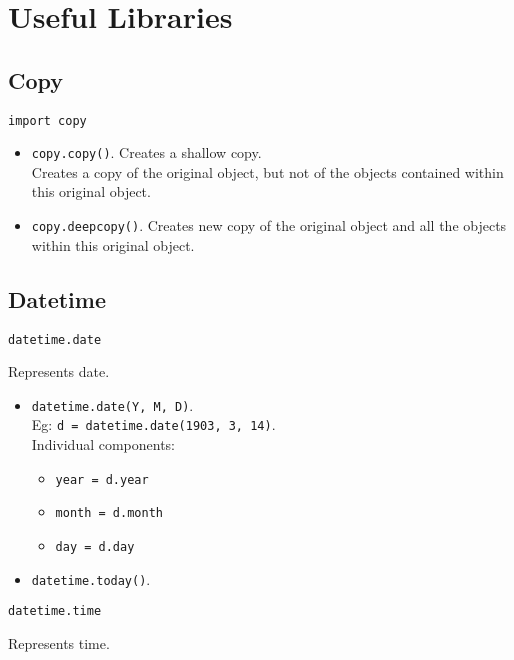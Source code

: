 \section{Useful Libraries}

\subsection{Copy}

\texttt{import copy}

\begin{itemize}
\item \texttt{copy.copy()}. Creates a shallow copy.\\
        Creates a copy of the original object, 
        but not of the objects contained within this original object.\\
\item \texttt{copy.deepcopy()}. Creates new copy of the original object
        and all the objects within this original object.\\
\end{itemize}



\subsection{Datetime}

\begin{center}
   \large{\texttt{datetime.date}} 
\end{center}
Represents date.
\begin{itemize}
\item \texttt{datetime.date(Y, M, D)}.\\
        Eg: \texttt{d = datetime.date(1903, 3, 14)}.\\
        Individual components:
        \begin{itemize}
        \item \texttt{year = d.year}
        \item \texttt{month = d.month}
        \item \texttt{day = d.day}
        \end{itemize}
\item \texttt{datetime.today()}.\\
\end{itemize}

\begin{center}
    \large{\texttt{datetime.time}}
\end{center}
Represents time.

